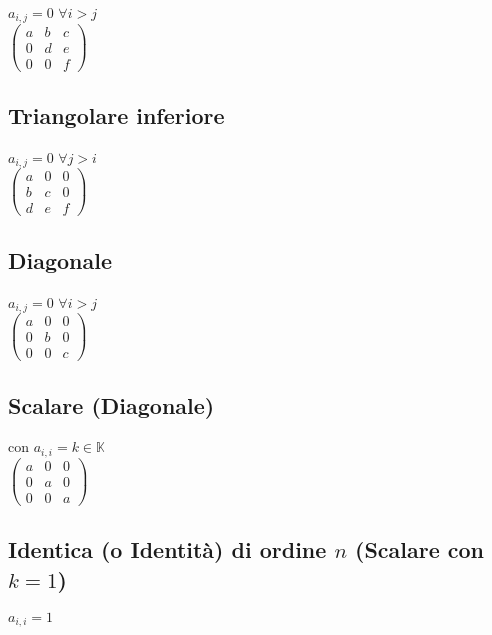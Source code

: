 \documentclass[a4paper, twoside, italian, 11pt]{book}
\newcommand{\K}{\mathbb K}
\begin{document}
$a_{i,j} = 0$ $\forall i > j$ \\

\noindent
$\begin{pmatrix}
a & b & c \\
0 & d & e \\
0 & 0 & f
\end{pmatrix}$


\subsection{Triangolare inferiore}

$a_{i,j} = 0$ $\forall j > i$ \\

\noindent
$\begin{pmatrix}
a & 0 & 0 \\
b & c & 0 \\
d & e & f
\end{pmatrix}$


\subsection{Diagonale}

$a_{i,j} = 0$ $\forall i > j$ \\

\noindent
$\begin{pmatrix}
a & 0 & 0 \\
0 & b & 0 \\
0 & 0 & c
\end{pmatrix}$


\subsection{Scalare (Diagonale)}

con $a_{i,i} = k \in \K$ \\

\noindent
$\begin{pmatrix}
a & 0 & 0 \\
0 & a & 0 \\
0 & 0 & a
\end{pmatrix}$


\subsection{Identica (o Identità) di ordine $n$ (Scalare con $k = 1$)}

$a_{i,i} = 1$ \\
\end{document}
